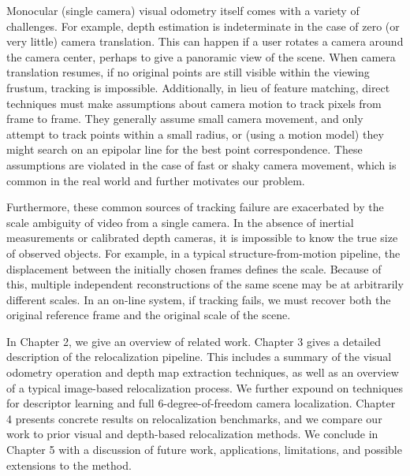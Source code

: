 Monocular (single camera) visual odometry itself comes with a variety of challenges. For example, depth estimation is indeterminate in the case of zero (or very little) camera translation. This can happen if a user rotates a camera around the camera center, perhaps to give a panoramic view of the scene. When camera translation resumes, if no original points are still visible within the viewing frustum, tracking is impossible. Additionally, in lieu of feature matching, direct techniques must make assumptions about camera motion to track pixels from frame to frame. They generally assume small camera movement, and only attempt to track points within a small radius, or (using a motion model) they might search on an epipolar line for the best point correspondence. These assumptions are violated in the case of fast or shaky camera movement, which is common in the real world and further motivates our problem.

Furthermore, these common sources of tracking failure are exacerbated by the scale ambiguity of video from a single camera. In the absence of inertial measurements or calibrated depth cameras, it is impossible to know the true size of observed objects. For example, in a typical structure-from-motion pipeline, the displacement between the initially chosen frames defines the scale. Because of this, multiple independent reconstructions of the same scene may be at arbitrarily different scales. In an on-line system, if tracking fails, we must recover both the original reference frame and the original scale of the scene.

In Chapter 2, we give an overview of related work. Chapter 3 gives a detailed description of the relocalization pipeline. This includes a summary of the visual odometry operation and depth map extraction techniques, as well as an overview of a typical image-based relocalization process. We further expound on techniques for descriptor learning and full \mbox{6-degree-of-freedom} camera localization. Chapter 4 presents concrete results on relocalization benchmarks, and we compare our work to prior visual and depth-based relocalization methods. We conclude in Chapter 5 with a discussion of future work, applications, limitations, and possible extensions to the method.

\cleardoublepage
